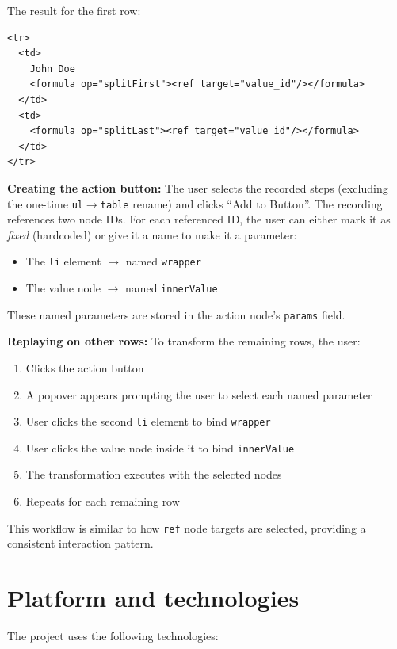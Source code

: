\documentclass{article}
\begin{document}
The result for the first row:
\begin{verbatim}
<tr>
  <td>
    John Doe
    <formula op="splitFirst"><ref target="value_id"/></formula>
  </td>
  <td>
    <formula op="splitLast"><ref target="value_id"/></formula>
  </td>
</tr>
\end{verbatim}

\textbf{Creating the action button:} The user selects the recorded steps (excluding the one-time \texttt{ul}$\rightarrow$\texttt{table} rename) and clicks ``Add to Button''. The recording references two node IDs. For each referenced ID, the user can either mark it as \emph{fixed} (hardcoded) or give it a name to make it a parameter:
\begin{itemize}
\setlength{\itemsep}{-3pt}
\item The \texttt{li} element $\rightarrow$ named \texttt{wrapper}
\item The value node $\rightarrow$ named \texttt{innerValue}
\end{itemize}

These named parameters are stored in the action node's \texttt{params} field.

\textbf{Replaying on other rows:} To transform the remaining rows, the user:
\begin{enumerate}
\setlength{\itemsep}{-3pt}
\item Clicks the action button
\item A popover appears prompting the user to select each named parameter
\item User clicks the second \texttt{li} element to bind \texttt{wrapper}
\item User clicks the value node inside it to bind \texttt{innerValue}
\item The transformation executes with the selected nodes
\item Repeats for each remaining row
\end{enumerate}

This workflow is similar to how \texttt{ref} node targets are selected, providing a consistent interaction pattern.


\section{Platform and technologies}

The project uses the following technologies:
\end{document}
